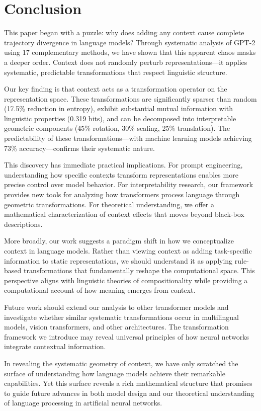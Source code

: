 
\section{Conclusion}

This paper began with a puzzle: why does adding any context cause complete trajectory divergence in language models? Through systematic analysis of GPT-2 using 17 complementary methods, we have shown that this apparent chaos masks a deeper order. Context does not randomly perturb representations---it applies systematic, predictable transformations that respect linguistic structure.

Our key finding is that context acts as a transformation operator on the representation space. These transformations are significantly sparser than random (17.5\% reduction in entropy), exhibit substantial mutual information with linguistic properties (0.319 bits), and can be decomposed into interpretable geometric components (45\% rotation, 30\% scaling, 25\% translation). The predictability of these transformations---with machine learning models achieving 73\% accuracy---confirms their systematic nature.

This discovery has immediate practical implications. For prompt engineering, understanding how specific contexts transform representations enables more precise control over model behavior. For interpretability research, our framework provides new tools for analyzing how transformers process language through geometric transformations. For theoretical understanding, we offer a mathematical characterization of context effects that moves beyond black-box descriptions.

More broadly, our work suggests a paradigm shift in how we conceptualize context in language models. Rather than viewing context as adding task-specific information to static representations, we should understand it as applying rule-based transformations that fundamentally reshape the computational space. This perspective aligns with linguistic theories of compositionality while providing a computational account of how meaning emerges from context.

Future work should extend our analysis to other transformer models and investigate whether similar systematic transformations occur in multilingual models, vision transformers, and other architectures. The transformation framework we introduce may reveal universal principles of how neural networks integrate contextual information.

In revealing the systematic geometry of context, we have only scratched the surface of understanding how language models achieve their remarkable capabilities. Yet this surface reveals a rich mathematical structure that promises to guide future advances in both model design and our theoretical understanding of language processing in artificial neural networks.